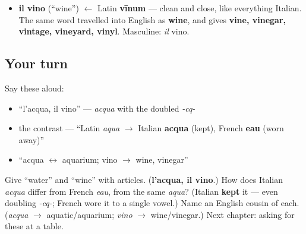 \begin{cousinweb}
\begin{itemize}
\raggedright
  \item \textbf{il vino} (\textquotedblleft{}wine\textquotedblright{}) $\leftarrow$ Latin \textbf{vīnum} — clean and close, like everything Italian. The same word travelled into English as \textbf{wine}, and gives \textbf{vine, vinegar, vintage, vineyard, vinyl}. Masculine: \emph{il} vino.
\end{itemize}
\end{cousinweb}

\subsection*{Your turn}
Say these aloud:

\begin{itemize}
\raggedright
  \item \textquotedblleft{}l'acqua, il vino\textquotedblright{} — \emph{acqua} with the doubled \emph{-cq-}
  \item the contrast — \textquotedblleft{}Latin \emph{aqua} $\to$ Italian \textbf{acqua} (kept), French \textbf{eau} (worn away)\textquotedblright{}
  \item \textquotedblleft{}acqua $\leftrightarrow$ aquarium; vino $\to$ wine, vinegar\textquotedblright{}
\end{itemize}

\begin{tcolorbox}[breakable,colback=teal!4,colframe=teal!35!black,title={Before you move on}]
Give \textquotedblleft{}water\textquotedblright{} and \textquotedblleft{}wine\textquotedblright{} with articles. (\textbf{l'acqua, il vino}.) How does Italian \emph{acqua} differ from French \emph{eau}, from the same \emph{aqua}? (Italian \textbf{kept} it — even doubling \emph{-cq-}; French wore it to a single vowel.) Name an English cousin of each. (\emph{acqua} $\to$ aquatic/aquarium; \emph{vino} $\to$ wine/vinegar.) Next chapter: asking for these at a table.
\end{tcolorbox}
